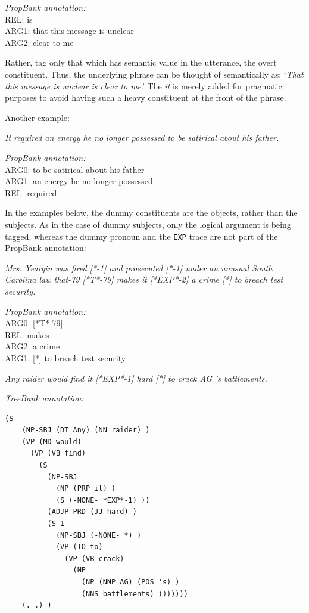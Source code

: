 \documentclass[11pt]{report}
\begin{document}
\textit{PropBank annotation:}\\
REL: is\\
ARG1: that this message is unclear\\
ARG2: clear to me

Rather, tag only that which has semantic value in the utterance, the overt constituent.  Thus, the underlying phrase can be thought of semantically as: `\textit{That this message is unclear is clear to me}.'  The \textit{it} is merely added for pragmatic purposes to avoid having such a heavy constituent at the front of the phrase.  
 
 Another example:

\textit{It required an energy he no longer possessed to be satirical about his father.}

\textit{PropBank annotation:}\\
ARG0: to be satirical about his father\\
ARG1: an energy he no longer possessed\\
REL: required

In the examples below, the dummy constituents are the objects, rather than the subjects. As in the case of dummy subjects, only the logical argument is being tagged, whereas the dummy pronoun and the \texttt{EXP} trace are not part of the PropBank annotation:

\textit{Mrs. Yeargin was fired [*-1] and prosecuted [*-1] under an unusual South Carolina law that-79 [*T*-79] makes it [*EXP*-2] a crime [*] to breach test security.}

\textit{PropBank annotation:}\\
ARG0:       [*T*-79] \\
REL:        makes\\
ARG2:   a crime\\
ARG1:   [*] to breach test security

\textit{Any raider would find it [*EXP*-1] hard [*] to crack AG 's battlements.}

\textit{TreeBank annotation:}
 \begin{verbatim}
(S 
    (NP-SBJ (DT Any) (NN raider) )
    (VP (MD would) 
      (VP (VB find) 
        (S 
          (NP-SBJ 
            (NP (PRP it) )
            (S (-NONE- *EXP*-1) ))
          (ADJP-PRD (JJ hard) )
          (S-1 
            (NP-SBJ (-NONE- *) )
            (VP (TO to) 
              (VP (VB crack) 
                (NP 
                  (NP (NNP AG) (POS 's) )
                  (NNS battlements) )))))))
    (. .) )
 \end{verbatim}
\end{document}
